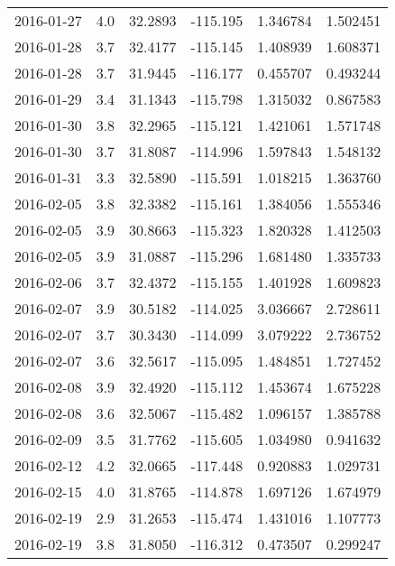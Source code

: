 \begin{tabular}{lrrrrr}
2016-01-27 &       4.0 &  32.2893 &  -115.195 &         1.346784 &         1.502451 \\
2016-01-28 &       3.7 &  32.4177 &  -115.145 &         1.408939 &         1.608371 \\
2016-01-28 &       3.7 &  31.9445 &  -116.177 &         0.455707 &         0.493244 \\
2016-01-29 &       3.4 &  31.1343 &  -115.798 &         1.315032 &         0.867583 \\
2016-01-30 &       3.8 &  32.2965 &  -115.121 &         1.421061 &         1.571748 \\
2016-01-30 &       3.7 &  31.8087 &  -114.996 &         1.597843 &         1.548132 \\
2016-01-31 &       3.3 &  32.5890 &  -115.591 &         1.018215 &         1.363760 \\
2016-02-05 &       3.8 &  32.3382 &  -115.161 &         1.384056 &         1.555346 \\
2016-02-05 &       3.9 &  30.8663 &  -115.323 &         1.820328 &         1.412503 \\
2016-02-05 &       3.9 &  31.0887 &  -115.296 &         1.681480 &         1.335733 \\
2016-02-06 &       3.7 &  32.4372 &  -115.155 &         1.401928 &         1.609823 \\
2016-02-07 &       3.9 &  30.5182 &  -114.025 &         3.036667 &         2.728611 \\
2016-02-07 &       3.7 &  30.3430 &  -114.099 &         3.079222 &         2.736752 \\
2016-02-07 &       3.6 &  32.5617 &  -115.095 &         1.484851 &         1.727452 \\
2016-02-08 &       3.9 &  32.4920 &  -115.112 &         1.453674 &         1.675228 \\
2016-02-08 &       3.6 &  32.5067 &  -115.482 &         1.096157 &         1.385788 \\
2016-02-09 &       3.5 &  31.7762 &  -115.605 &         1.034980 &         0.941632 \\
2016-02-12 &       4.2 &  32.0665 &  -117.448 &         0.920883 &         1.029731 \\
2016-02-15 &       4.0 &  31.8765 &  -114.878 &         1.697126 &         1.674979 \\
2016-02-19 &       2.9 &  31.2653 &  -115.474 &         1.431016 &         1.107773 \\
2016-02-19 &       3.8 &  31.8050 &  -116.312 &         0.473507 &         0.299247 \\

\end{tabular}
